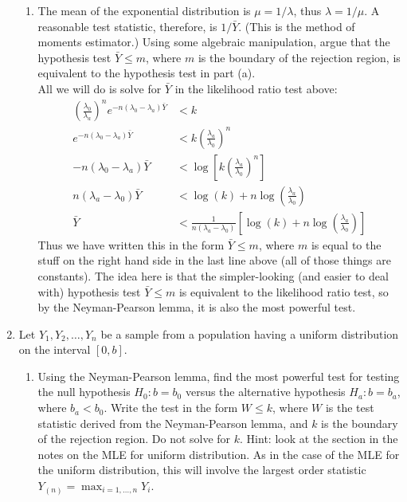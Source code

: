 \documentclass[12pt]{article}
\begin{document}
\begin{enumerate}
\begin{enumerate}
\item The mean of the exponential distribution is $\mu = 1 / \lambda$, thus $\lambda = 1 / \mu$. A reasonable test statistic, therefore, is $1 / \bar{Y}$. (This is the method of moments estimator.) Using some algebraic manipulation, argue that the hypothesis test $\bar{Y} \leq m$, where $m$ is the boundary of the rejection region, is equivalent to the hypothesis test in part (a).\\

All we will do is solve for $\bar{Y}$ in the likelihood ratio test above:
\begin{align*}
\left( \frac{ \lambda_0 }{\lambda_a }\right)^n e^{-n (\lambda_0 - \lambda_a) \bar{Y}} &< k\\
e^{-n (\lambda_0 - \lambda_a) \bar{Y}} &< k \left( \frac{ \lambda_a }{\lambda_0 }\right)^n\\
-n (\lambda_0 - \lambda_a) \bar{Y} &< \log\left[ k \left( \frac{ \lambda_a }{\lambda_0 }\right)^n \right]\\
n (\lambda_a - \lambda_0) \bar{Y} &< \log(k) + n\log\left( \frac{ \lambda_a }{\lambda_0 } \right)\\
\bar{Y} &< \frac{1}{n(\lambda_a - \lambda_0)} \left[ \log(k) + n\log\left( \frac{ \lambda_a }{\lambda_0 } \right) \right]
\end{align*}
Thus we have written this in the form $\bar{Y} \leq m$, where $m$ is equal to the stuff on the right hand side in the last line above (all of those things are constants). The idea here is that the simpler-looking (and easier to deal with) hypothesis test $\bar{Y} \leq m$ is equivalent to the likelihood ratio test, so by the Neyman-Pearson lemma, it is also the most powerful test.
\end{enumerate}

\item Let $Y_1, Y_2, \dots, Y_n$ be a sample from a population having a uniform distribution on the interval $[0, b]$. 
\begin{enumerate}
\item Using the Neyman-Pearson lemma, find the most powerful test for testing the null hypothesis $H_0: b = b_0$ versus the alternative hypothesis $H_a: b = b_a$, where $b_a < b_0$. Write the test in the form $W \leq k$, where $W$ is the test statistic derived from the Neyman-Pearson lemma, and $k$ is the boundary of the rejection region. Do not solve for $k$. Hint: look at the section in the notes on the MLE for uniform distribution. As in the case of the MLE for the uniform distribution, this will involve the largest order statistic $Y_{(n)} = \max_{i = 1, \dots, n} Y_i$.\\


\end{enumerate}
\end{enumerate}
\end{document}
